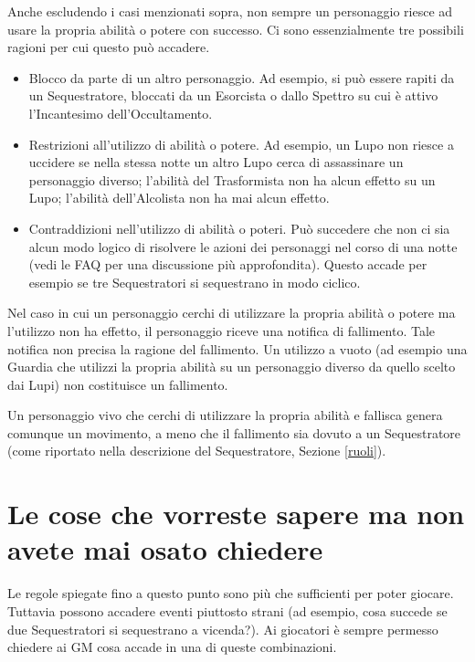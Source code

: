 \documentclass[a4paper,10pt]{article}
\begin{document}
Anche escludendo i casi menzionati sopra, non sempre un personaggio riesce ad usare la propria abilità o potere con successo. Ci sono essenzialmente tre possibili ragioni per cui questo può accadere.

\begin{itemize}
	\item Blocco da parte di un altro personaggio. Ad esempio, si può essere rapiti da un Sequestratore, bloccati da un Esorcista o dallo Spettro su cui è attivo l'Incantesimo dell'Occultamento.
	\item Restrizioni all'utilizzo di abilità o potere. Ad esempio, un Lupo non riesce a uccidere se nella stessa notte un altro Lupo cerca di assassinare un personaggio diverso; l'abilità del Trasformista non ha alcun effetto su un Lupo; l'abilità dell'Alcolista non ha mai alcun effetto.
	\item Contraddizioni nell'utilizzo di abilità o poteri. Può succedere che non ci sia alcun modo logico di risolvere le azioni dei personaggi nel corso di una notte (vedi le FAQ per una discussione più approfondita). Questo accade per esempio se tre Sequestratori si sequestrano in modo ciclico.
\end{itemize}

Nel caso in cui un personaggio cerchi di utilizzare la propria abilità o potere ma l'utilizzo non ha effetto, il personaggio riceve una notifica di fallimento. Tale notifica non precisa la ragione del fallimento. Un utilizzo a vuoto (ad esempio una Guardia che utilizzi la propria abilità su un personaggio diverso da quello scelto dai Lupi) non costituisce un fallimento.

Un personaggio vivo che cerchi di utilizzare la propria abilità e fallisca genera comunque un movimento, a meno che il fallimento sia dovuto a un Sequestratore (come riportato nella descrizione del Sequestratore, Sezione \ref{ruoli}).

\pagebreak

\section{Le cose che vorreste sapere ma non avete mai osato chiedere}
\label{faq}

Le regole spiegate fino a questo punto sono più che sufficienti per poter giocare. Tuttavia possono accadere eventi piuttosto strani (ad esempio, cosa succede se due Sequestratori si sequestrano a vicenda?). Ai giocatori è sempre permesso chiedere ai GM cosa accade in una di queste combinazioni.
\end{document}
